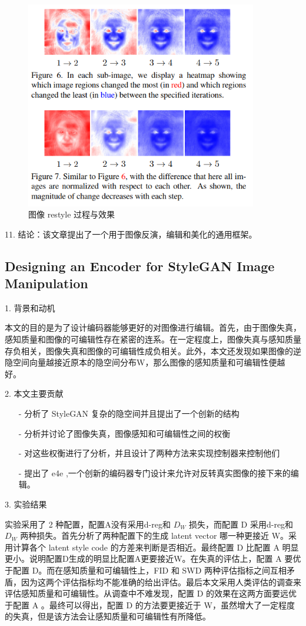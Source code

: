 \begin{figure}[htb]
\centering 
\includegraphics[width=0.9\textwidth]{img/m2t28.png} 
\caption{图像 restyle 过程与效果}
\label{Test}
\end{figure}

11. 结论：该文章提出了一个用于图像反演，编辑和美化的通用框架。

\subsection{Designing an Encoder for StyleGAN Image Manipulation}

1. 背景和动机

本文的目的是为了设计编码器能够更好的对图像进行编辑。首先，由于图像失真，感知质量和图像的可编辑性存在紧密的连系。在一定程度上，图像失真与感知质量存负相关，图像失真和图像的可编辑性成负相关。此外，本文还发现如果图像的逆隐空间向量越接近原本的隐空间分布W，那么图像的感知质量和可编辑性便越好。

2. 本文主要贡献

\begin{enumerate}
 \item [-] 分析了 StyleGAN 复杂的隐空间并且提出了一个创新的结构
 \item [-] 分析并讨论了图像失真，图像感知和可编辑性之间的权衡
 \item [-] 对这些权衡进行了分析，并且设计了两种方法来实现控制器来控制他们
 \item [-] 提出了 e4e ,一个创新的编码器专门设计来允许对反转真实图像的接下来的编辑。
\end{enumerate}

3. 实验结果

实验采用了 2 种配置，配置A没有采用d-reg和 $D_W$ 损失，而配置 D 采用d-reg和 $D_W$ 两种损失。首先分析了两种配置下的生成 latent vector 哪一种更接近 W。采用计算各个 latent style code 的方差来判断是否相近。最终配置 D 比配置 A 明显更小。说明配置D生成的明显比配置A更要接近W。在失真的评估上，配置 A 要优于配置 D。而在感知质量和可编辑性上，FID 和 SWD 两种评估指标之间互相矛盾，因为这两个评估指标均不能准确的给出评估。最后本文采用人类评估的调查来评估感知质量和可编辑性。从调查中不难发现，配置 D 的效果在这两方面要远优于配置 A 。最终可以得出，配置 D 的方法要更接近于 W，虽然增大了一定程度的失真，但是该方法会让感知质量和可编辑性有所降低。


